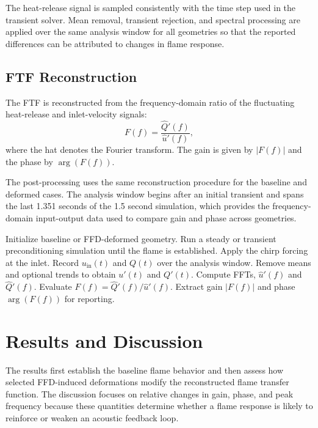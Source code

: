 \documentclass{iopconfser}
\begin{document}
The heat-release signal is sampled consistently with the time step used in the transient solver. Mean removal, transient rejection, and spectral processing are applied over the same analysis window for all geometries so that the reported differences can be attributed to changes in flame response.

\subsection{FTF Reconstruction}
\label{subsec:ftf}

The FTF is reconstructed from the frequency-domain ratio of the fluctuating heat-release and inlet-velocity signals:
\begin{equation}
  F(f) = \frac{\hat{Q}'(f)}{\hat{u}'(f)},
  \label{eq:ftf-definition}
\end{equation}
where the hat denotes the Fourier transform. The gain is given by $|F(f)|$ and the phase by $\arg(F(f))$.

The post-processing uses the same reconstruction procedure for the baseline and deformed cases. The analysis window begins after an initial transient and spans the last 1.351 seconds of the 1.5 second simulation, which provides the frequency-domain input-output data used to compare gain and phase across geometries.

\begin{algorithm}[!htbp]
  \caption{Broadband FTF reconstruction workflow.}
  \label{alg:workflow}
  \begin{algorithmic}[1]
    \State Initialize baseline or FFD-deformed geometry.
    \State Run a steady or transient preconditioning simulation until the flame is established.
    \State Apply the chirp forcing at the inlet.
    \State Record $u_{\mathrm{in}}(t)$ and $Q(t)$ over the analysis window.
    \State Remove means and optional trends to obtain $u'(t)$ and $Q'(t)$.
    \State Compute FFTs, $\hat{u}'(f)$ and $\hat{Q}'(f)$.
    \State Evaluate $F(f)=\hat{Q}'(f)/\hat{u}'(f)$.
    \State Extract gain $|F(f)|$ and phase $\arg(F(f))$ for reporting.
  \end{algorithmic}
\end{algorithm}
\FloatBarrier

\section{Results and Discussion}
\label{sec:results}

The results first establish the baseline flame behavior and then assess how selected FFD-induced deformations modify the reconstructed flame transfer function. The discussion focuses on relative changes in gain, phase, and peak frequency because these quantities determine whether a flame response is likely to reinforce or weaken an acoustic feedback loop.
\end{document}
